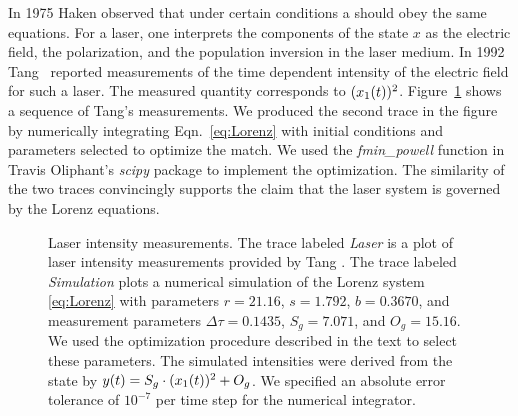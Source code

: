 In 1975 Haken\cite{Haken75} observed that under certain conditions a
 should obey the same equations.  For a laser, one
interprets the components of the state $x$ as the electric field, the
polarization, and the population inversion in the laser medium.  In
1992 %
%
Tang \etal\cite{Tang92}\ reported measurements of the time %
dependent intensity of the electric field for such a laser.  The
measured quantity corresponds to $({x_1}{(t)})^2$.
Figure~\ref{fig:LaserLP5} shows a sequence of Tang's measurements.  We
produced the second trace in the figure by numerically integrating
Eqn.~\eqref{eq:Lorenz} with initial conditions and parameters selected
to optimize the match.  We used the \emph{fmin\_powell} function in
Travis Oliphant's \emph{scipy} package\cite{scipy} to implement the
optimization. %
The similarity of the two traces convincingly supports the claim that
the laser system is governed by the Lorenz equations.
\begin{figure}[htbp]
  \caption[Laser intensity measurements.]%
  {Laser intensity measurements.  The trace labeled \emph{Laser} is a
    plot of laser intensity measurements provided by Tang \etal.  The
    trace labeled \emph{Simulation} plots a numerical simulation of
    the Lorenz system \eqref{eq:Lorenz} with parameters $r=21.16$,
    $s=1.792$, $b=0.3670$, and measurement parameters $\Delta
    \tau=0.1435$, $S_g = 7.071$, and $O_g =15.16$.  We used the
    optimization procedure described in the text to select these
    parameters.  The simulated intensities were derived from the
    state by ${y}{(t)} = S_g \cdot ({x_1}{(t)})^2 + O_g$.  We
    specified an absolute error tolerance of $10^{-7}$ per time step
    for the numerical integrator.}
  \label{fig:LaserLP5}
\end{figure}

